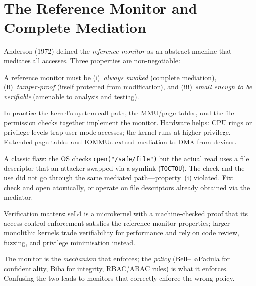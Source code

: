 \section{The Reference Monitor and Complete Mediation}
\label{sec:ref-monitor}
Anderson (1972) defined the \emph{reference monitor} as an abstract machine that mediates all accesses. Three properties are non-negotiable:
\begin{definition}
A reference monitor must be (i)~\emph{always invoked} (complete mediation), (ii)~\emph{tamper-proof} (itself protected from modification), and (iii)~\emph{small enough to be verifiable} (amenable to analysis and testing).
\end{definition}
In practice the kernel's system-call path, the MMU/page tables, and the file-permission checks together implement the monitor. Hardware helps: CPU rings or privilege levels trap user-mode accesses; the kernel runs at higher privilege. Extended page tables and IOMMUs extend mediation to DMA from devices.
\begin{example}
A classic flaw: the OS checks \texttt{open("/safe/file")} but the actual read uses a file descriptor that an attacker swapped via a symlink (\texttt{TOCTOU}). The check and the use did not go through the same mediated path---property~(i) violated. Fix: check and open atomically, or operate on file descriptors already obtained via the mediator.
\end{example}
Verification matters: seL4 is a microkernel with a machine-checked proof that its access-control enforcement satisfies the reference-monitor properties; larger monolithic kernels trade verifiability for performance and rely on code review, fuzzing, and privilege minimisation instead.
\begin{remark}
The monitor is the \emph{mechanism} that enforces; the \emph{policy} (Bell--LaPadula for confidentiality, Biba for integrity, RBAC/ABAC rules) is what it enforces. Confusing the two leads to monitors that correctly enforce the wrong policy.
\end{remark}
